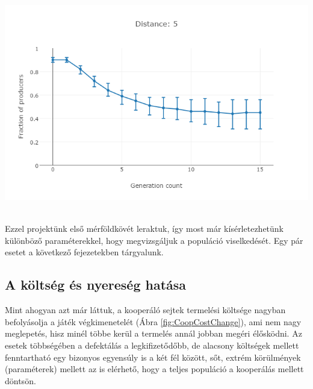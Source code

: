 \begin{minipage}{\linewidth}
\begin{multicols}{2}
\begin{Figure}
		\end{Figure}
		\begin{Figure}
			\centering
			\includegraphics[width=\linewidth]{images/dist5}
		\end{Figure}
	\end{multicols}
\end{minipage}\\

Ezzel projektünk első mérföldkövét leraktuk, így most már kísérletezhetünk különböző paraméterekkel, hogy megvizsgáljuk a populáció viselkedését. Egy pár esetet a következő fejezetekben tárgyalunk.

\subsection{A költség és nyereség hatása}

Mint ahogyan azt már láttuk, a kooperáló sejtek termelési költsége nagyban befolyásolja a játék végkimenetelét (Ábra \ref{fig:CoopCostChange}), ami nem nagy meglepetés, hisz minél többe kerül a termelés annál jobban megéri élősködni. Az esetek többségében a defektálás a legkifizetődőbb, de alacsony költségek mellett fenntartható egy bizonyos egyensúly is a két fél között, sőt, extrém körülmények (paraméterek) mellett az is elérhető, hogy a teljes populáció a kooperálás mellett döntsön.

